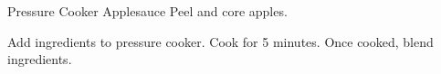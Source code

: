 \documentclass[../cookbook.tex]{subfiles}
\begin{document}
\begin{recipe}{Pressure Cooker Applesauce}{}{}
    Peel and core apples.

    Add ingredients to pressure cooker. Cook for 5 minutes.
    Once cooked, blend ingredients.

\end{recipe}
\end{document}
